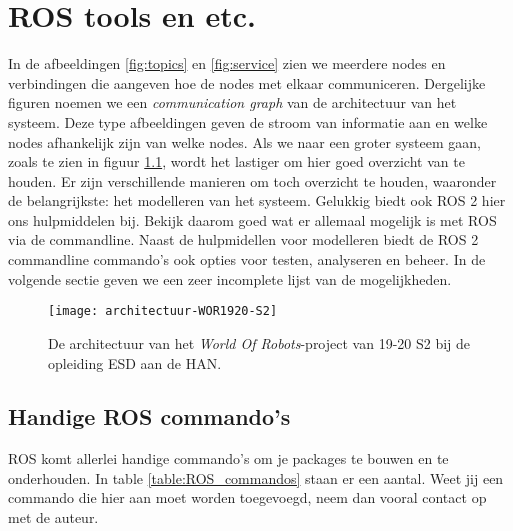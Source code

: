 \chapter{ROS tools en etc.}
In de afbeeldingen \ref{fig:topics} en \ref{fig:service} zien we meerdere nodes en verbindingen die aangeven hoe de nodes met elkaar communiceren. Dergelijke figuren noemen we een \textit{communication graph} van de architectuur van het systeem. Deze type afbeeldingen geven de stroom van informatie aan en welke nodes afhankelijk zijn van welke nodes. Als we naar een groter systeem gaan, zoals te zien in figuur \ref{fig:architectuur-WOR1920-S2}, wordt het lastiger om hier goed overzicht van te houden. Er zijn verschillende manieren om toch overzicht te houden, waaronder de belangrijkste: het modelleren van het systeem. Gelukkig biedt ook ROS 2 hier ons hulpmiddelen bij. Bekijk daarom goed wat er allemaal mogelijk is met ROS via de commandline. Naast de hulpmidellen voor modelleren biedt de ROS 2 commandline commando's ook opties voor testen, analyseren en beheer. In de volgende sectie geven we een zeer incomplete lijst van de mogelijkheden.

\begin{figure}[ht]
\begin{center}
\texttt{[image: architectuur-WOR1920-S2]}\\
\end{center}
\caption{De architectuur van het \textit{World Of Robots}-project van 19-20 S2 bij de opleiding ESD aan de HAN.}\label{fig:architectuur-WOR1920-S2}
\end{figure}

\section{Handige ROS commando's}
ROS komt allerlei handige commando's om je packages te bouwen en te onderhouden. In table \ref{table:ROS_commandos} staan er een aantal. Weet jij een commando die hier aan moet worden toegevoegd, neem dan vooral contact op met de auteur. 

